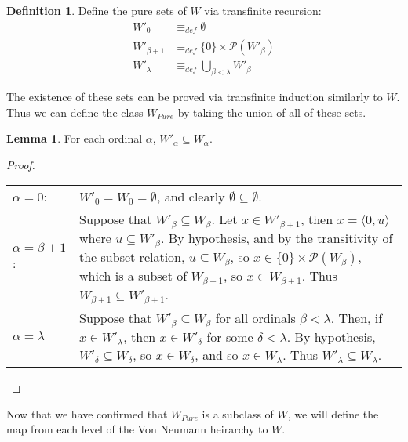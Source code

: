 \documentclass[11pt]{report}
\newcommand{\eqdef}{\equiv_\mathit{def}}
\newcommand{\pair}[2]{\langle #1,#2 \rangle}
\theoremstyle{definition}
\theoremstyle{theorem}
\theoremstyle{lemma}
\newtheorem{definition}{Definition}[section]
\newtheorem{lemma}[theorem]{Lemma}
\begin{document}
\begin{definition}
Define the pure sets of $W$ via transfinite recursion:
\begin{align*}
W'_0 &\eqdef \emptyset\\
W'_{\beta+1} &\eqdef \{0\}\times\mathcal{P}(W'_\beta) \\
W'_\lambda &\eqdef \bigcup_{\beta < \lambda} W'_\beta
\end{align*}
\end{definition}
\noindent
The existence of these sets can be proved via transfinite induction similarly to $W$. Thus we can define the class $W_{\mathit{Pure}}$ by taking the union of all of these sets.
\begin{lemma} For each ordinal $\alpha$, $W'_\alpha \subseteq W_\alpha$.
  \begin{proof} \hspace{1mm}\\
    \begin{tabular}{p{20mm} p{10cm}}
      $\alpha = 0$: \rule{0pt}{4ex} &
      $W'_0 = W_0 = \emptyset$, and clearly $\emptyset \subseteq \emptyset$. \\
      $\alpha = \beta+1$: \rule{0pt}{4ex} &
      Suppose that $W'_\beta \subseteq W_\beta$. Let $x\in W'_{\beta+1}$, then $x = \pair{0}{u}$ where $u \subseteq W'_\beta$. By hypothesis, and by the transitivity of the subset relation, $u\subseteq W_\beta$, so $x\in\{0\}\times\mathcal{P}(W_\beta)$, which is a subset of $W_{\beta+1}$, so $x\in W_{\beta+1}$. Thus $W_{\beta+1} \subseteq W'_{\beta+1}$.
      \\
      $\alpha = \lambda$ \rule{0pt}{4ex} &
      Suppose that $W'_{\beta} \subseteq W_{\beta}$ for all ordinals $\beta < \lambda$. Then, if $x\in W'_\lambda$, then $x\in W'_\delta$ for some $\delta < \lambda$. By hypothesis, $W'_\delta \subseteq W_\delta$, so $x\in W_\delta$, and so $x\in W_\lambda$. Thus $W'_\lambda\subseteq W_\lambda$.
    \end{tabular}
  \end{proof}
\end{lemma}
\noindent
Now that we have confirmed that $W_{\mathit{Pure}}$ is a subclass of $W$, we will define the map from each level of the Von Neumann heirarchy to $W$.
\end{document}

